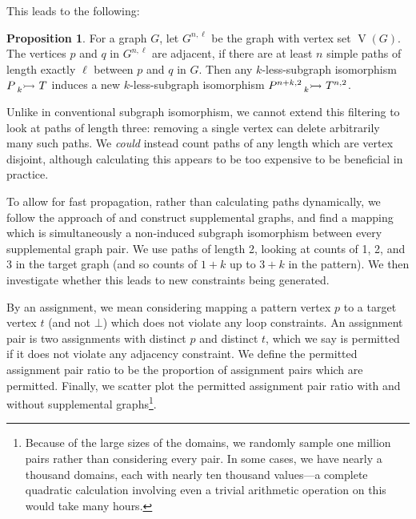 \documentclass[letterpaper]{article}
\newcommand{\citet}[1]{\citeauthor{#1} \shortcite{#1}}
\theoremstyle{definition}
\newtheorem{proposition}{Proposition}
\newcommand{\lessnonind}[1]{\prescript{}{#1}{\rightarrowtail}\ }
\newcommand{\V}{\operatorname{V}}
\begin{document}
This leads to the following:

\begin{proposition}
    For a graph $G$, let $G^{n, \ell}$ be the graph with vertex set $\V(G)$. The
    vertices $p$ and $q$ in $G^{n, \ell}$ are adjacent, if there are at least $n$ simple paths of
    length exactly $\ell$ between $p$ and $q$ in $G$. Then any $k$-less-subgraph isomorphism
    $P \lessnonind{k} T$ induces a new $k$-less-subgraph isomorphism
    $P^{n+k, 2}\lessnonind{k} T^{n, 2}$.
\end{proposition}

Unlike in conventional subgraph isomorphism, we cannot extend this filtering to look at paths of
length three: removing a single vertex can delete arbitrarily many such paths. We \emph{could}
instead count paths of any length which are vertex disjoint, although calculating this appears to be
too expensive to be beneficial in practice.

To allow for fast propagation, rather than calculating paths dynamically, we follow the approach of
\citet{DBLP:conf/cp/McCreeshP15} and construct supplemental graphs, and find a mapping which is
simultaneously a non-induced subgraph isomorphism between every supplemental graph pair. We use
paths of length 2, looking at counts of 1, 2, and 3 in the target graph (and so counts of $1 + k$ up
to $3 + k$ in the pattern).  We then investigate whether this leads to new constraints being
generated.

By an assignment, we mean considering mapping a pattern vertex $p$ to a target vertex $t$ (and not
$\bot$) which does not violate any loop constraints. An assignment pair is two assignments with
distinct $p$ and distinct $t$, which we say is permitted if it does not violate any adjacency
constraint. We define the permitted assignment pair ratio to be the proportion of assignment pairs
which are permitted.  Finally, we scatter plot the permitted assignment pair ratio with and without
supplemental graphs\footnote{Because of the large sizes of the domains, we randomly sample one
million pairs rather than considering every pair. In some cases, we have nearly a thousand domains,
each with nearly ten thousand values---a complete quadratic calculation involving even a trivial
arithmetic operation on this would take many hours.}.
\end{document}
